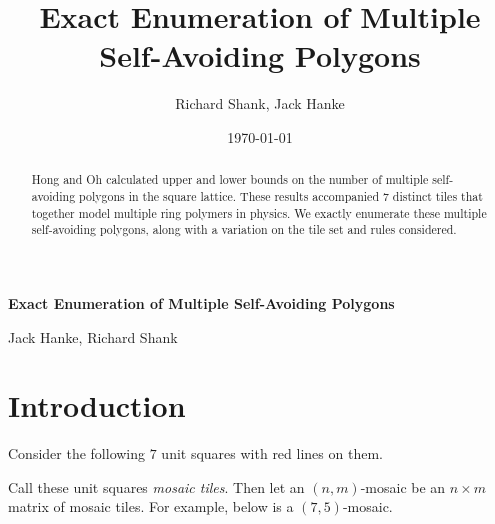 \documentclass[12pt]{article}
\title{Exact Enumeration of Multiple Self-Avoiding Polygons}
\author{Richard Shank, Jack Hanke}
\date{\today}
\theoremstyle{plain}
\theoremstyle{definition}
\theoremstyle{remark}
\theoremstyle{definition}
\newcommand{\cell}[4]{ \draw[thick] ( #1 , #2 ) rectangle ( #3 , #4 );}
\newcommand{\cellA}[4]{ \draw[thick] ( #1 , #2 ) rectangle ( #3 , #4 ); \draw[red, thick] (#3 * 0.5 + #1 * 0.5 , #2) -- (#3, #4 * 0.5 + #2 * 0.5);}
\newcommand{\cellB}[4]{ \draw[thick] ( #1 , #2 ) rectangle ( #3 , #4 ); \draw[red, thick] (#3 * 0.5 + #1 * 0.5 , #2) -- (#1, #4 * 0.5 + #2 * 0.5);}
\newcommand{\cellC}[4]{ \draw[thick] ( #1 , #2 ) rectangle ( #3 , #4 ); \draw[red, thick] (#3 * 0.5 + #1 * 0.5 , #4) -- (#1, #4 * 0.5 + #2 * 0.5);}
\newcommand{\cellD}[4]{ \draw[thick] ( #1 , #2 ) rectangle ( #3 , #4 ); \draw[red, thick] (#3 * 0.5 + #1 * 0.5 , #4) -- (#3, #4 * 0.5 + #2 * 0.5);}
\newcommand{\cellE}[4]{ \draw[thick] ( #1 , #2 ) rectangle ( #3 , #4 ); \draw[red, thick] (#3 * 0.5 + #1 * 0.5 , #2) -- (#3 * 0.5 + #1 * 0.5 , #4);}
\newcommand{\cellF}[4]{ \draw[thick] ( #1 , #2 ) rectangle ( #3 , #4 ); \draw[red, thick] (#3, #4 * 0.5 + #2 * 0.5) -- (#1, #4 * 0.5 + #2 * 0.5);}
\begin{document}
\begin{center}
    \Large
    \textbf{Exact Enumeration of Multiple Self-Avoiding Polygons}
    
    \vspace{0.4cm}
    \large
    
    Jack Hanke, Richard Shank
    \vspace{0.4cm}
    
    \vspace{0.4cm}    

    \begin{abstract}
        Hong and Oh calculated upper and lower bounds on the number of multiple self-avoiding polygons in the square lattice. These results accompanied $7$ distinct tiles that together model multiple ring polymers in physics. We exactly enumerate these multiple self-avoiding polygons, along with a variation on the tile set and rules considered.
    \end{abstract}

\end{center}

\section{Introduction}

Consider the following $7$ unit squares with red lines on them.

\begin{center}
\end{center}

Call these unit squares \textit{mosaic tiles}. Then let an $(n,m)$-mosaic be an $n \times m$ matrix of mosaic tiles. For example, below is a $(7,5)$-mosaic.
\end{document}
